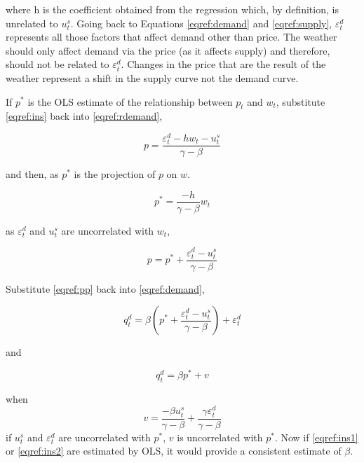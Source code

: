 \documentclass[12pt, a4paper, oneside]{article}\usepackage[]{graphicx}\usepackage[]{color}
\begin{document}
where h is the coefficient obtained from the regression which, by definition, is unrelated to $u_t^s$.  Going back to Equations \ref{eqref:demand} and \ref{eqref:supply}, $\varepsilon_t^d$ represents all those factors that affect demand other than price.  The weather should only affect demand via the price (as it affects supply) and therefore, should not be related to $\varepsilon_t^d$.  Changes in the price that are the result of the weather represent a shift in the supply curve not the demand curve.  

If $p^*$ is the OLS estimate of the relationship between $p_t$ and $w_t$, substitute \ref{eqref:ins} back into \ref{eqref:rdemand}, 

\begin{equation}
p = \frac{\varepsilon_t^d - hw_t -u_t^s}{\gamma - \beta}
\end{equation}

and then, as $p^*$ is the projection of $p$ on $w$.  

\begin{equation}
p^* = \frac{-h}{\gamma - \beta} w_t
\end{equation}

as $\varepsilon_t^d$ and $u_t^s$ are uncorrelated with $w_t$, 

\begin{equation}
\label{eqref:pp}
p=p^*+\frac{\varepsilon_t^d - u_t^s}{\gamma - \beta}
\end{equation}

Substitute \ref{eqref:pp} back into \ref{eqref:demand}, 

\begin{equation}
\label{eqref:ins1}
q_t^d=\beta \left( p^* + \frac{\varepsilon_t^d - u_t^s}{\gamma - \beta} \right) + \varepsilon_t^d
\end{equation}

and 

\begin{equation}
\label{eqref:ins2}
q_t^d=\beta p^*+v
\end{equation}

when 
\begin{equation}
v=\frac{-\beta u_t^s}{\gamma - \beta} + \frac{\gamma \varepsilon_t^d}{\gamma - \beta}
\end{equation}
if $u_t^s$ and $\varepsilon_t^d$ are uncorrelated with $p^*$, $v$ is uncorrelated with $p^*$.  Now if  \ref{eqref:ins1} or \ref{eqref:ins2} are estimated  by OLS, it would provide a consistent estimate of $\beta$.
\end{document}

